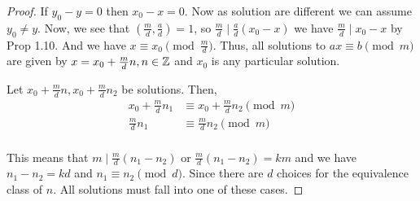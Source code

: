 \begin{proof}
    If $y_0 - y = 0$ then $x_0 - x = 0$. Now as solution are different we can assume $y_0 \ne y$. Now, we see that $(\frac{m}{d}, \frac{a}{d}) = 1$, so $\frac{m}{d} \mid \frac{a}{d}(x_0 - x)$ we have $\frac{m}{d} \mid x_0 - x$ by Prop 1.10. And we have $x \equiv x_0 \pmod {\frac{m}{d}}$. Thus, all solutions to $ax \equiv b \pmod m$ are given by $x = x_0 + \frac{m}{d} n, n \in \mathbb{Z}$ and $x_0$ is any particular solution.

    \vspace{1em}
    
    Let $x_0 + \frac{m}{d}n, x_0 + \frac{m}{d} n_2$ be solutions. Then, 
    \begin{align*}
        x_0 + \frac{m}{d} n_1 &\equiv x_0 + \frac{m}{d}n_2 \pmod m\\
         \frac{m}{d} n_1 &\equiv  \frac{m}{d}n_2 \pmod m\\
    \end{align*}

    This means that $m \mid \frac{m}{d}(n_1 - n_2)$ or $\frac{m}{d}(n_1 - n_2) = km$ and we have $n_1 - n_2 = kd$ and $n_1 \equiv n_2 \pmod d$. Since there are $d$ choices for the equivalence class of $n$. All solutions must fall into one of these cases.

\end{proof}










